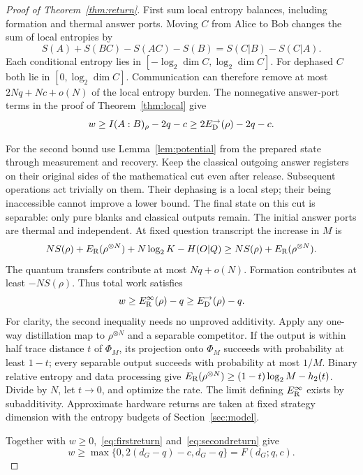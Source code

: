 \begin{proof}[Proof of Theorem~\ref{thm:return}]
First sum local entropy balances, including formation and thermal answer ports. Moving $C$ from Alice to Bob changes the sum of local entropies by
\[
 S(A)+S(BC)-S(AC)-S(B)=S(C|B)-S(C|A).
\]
Each conditional entropy lies in $[-\log_2\dim C,\log_2\dim C]$. For dephased $C$ both lie in $[0,\log_2\dim C]$. Communication can therefore remove at most $2Nq+Nc+o(N)$ of the local entropy burden. The nonnegative answer-port terms in the proof of Theorem~\ref{thm:local} give
\begin{equation}
 w\ge I(A:B)_\rho-2q-c\ge2E_{\mathrm D}^{\to}(\rho)-2q-c.\label{eq:firstreturn}
\end{equation}

For the second bound use Lemma~\ref{lem:potential} from the prepared state through measurement and recovery. Keep the classical outgoing answer registers on their original sides of the mathematical cut even after release. Subsequent operations act trivially on them. Their dephasing is a local step; their being inaccessible cannot improve a lower bound. The final state on this cut is separable: only pure blanks and classical outputs remain. The initial answer ports are thermal and independent. At fixed question transcript the increase in $M$ is
\[
 NS(\rho)+E_{\mathrm R}(\rho^{\otimes N})
      +N\log_2K-H(O|Q)
 \ge NS(\rho)+E_{\mathrm R}(\rho^{\otimes N}).
\]
The quantum transfers contribute at most $Nq+o(N)$. Formation contributes at least $-NS(\rho)$. Thus total work satisfies
\begin{equation}
 w\ge E_{\mathrm R}^\infty(\rho)-q\ge E_{\mathrm D}^{\to}(\rho)-q.\label{eq:secondreturn}
\end{equation}
For clarity, the second inequality needs no unproved additivity. Apply any one-way distillation map to $\rho^{\otimes N}$ and a separable competitor. If the output is within half trace distance $t$ of $\Phi_M$, its projection onto $\Phi_M$ succeeds with probability at least $1-t$; every separable output succeeds with probability at most $1/M$. Binary relative entropy and data processing give $E_{\mathrm R}(\rho^{\otimes N})\ge(1-t)\log_2M-h_2(t)$. Divide by $N$, let $t\to0$, and optimize the rate. The limit defining $E_{\mathrm R}^\infty$ exists by subadditivity. Approximate hardware returns are taken at fixed strategy dimension with the entropy budgets of Section~\ref{sec:model}.

Together with $w\ge0$,~\eqref{eq:firstreturn} and~\eqref{eq:secondreturn} give
\[
 w\ge\max\{0,2(d_G-q)-c,d_G-q\}=F(d_G;q,c).
\]


\end{proof}
